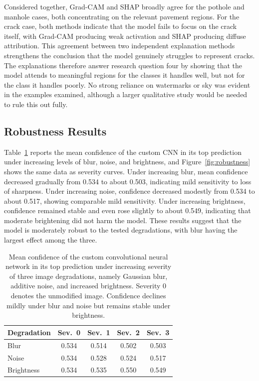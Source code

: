 \documentclass[preprint,12pt]{elsarticle}
\begin{document}
Considered together, Grad-CAM and SHAP broadly agree for the pothole and manhole cases, both concentrating on the relevant pavement regions.
For the crack case, both methods indicate that the model fails to focus on the crack itself, with Grad-CAM producing weak activation and SHAP producing diffuse attribution.
This agreement between two independent explanation methods strengthens the conclusion that the model genuinely struggles to represent cracks.
The explanations therefore answer research question four by showing that the model attends to meaningful regions for the classes it handles well, but not for the class it handles poorly.
No strong reliance on watermarks or sky was evident in the examples examined, although a larger qualitative study would be needed to rule this out fully.

\subsection{Robustness Results}

Table~\ref{tab:robustness} reports the mean confidence of the custom CNN in its top prediction under increasing levels of blur, noise, and brightness, and Figure~\ref{fig:robustness} shows the same data as severity curves.
Under increasing blur, mean confidence decreased gradually from 0.534 to about 0.503, indicating mild sensitivity to loss of sharpness.
Under increasing noise, confidence decreased modestly from 0.534 to about 0.517, showing comparable mild sensitivity.
Under increasing brightness, confidence remained stable and even rose slightly to about 0.549, indicating that moderate brightening did not harm the model.
These results suggest that the model is moderately robust to the tested degradations, with blur having the largest effect among the three.

\begin{table}[!ht]
\centering
\caption{Mean confidence of the custom convolutional neural network in its top prediction under increasing severity of three image degradations, namely Gaussian blur, additive noise, and increased brightness. Severity 0 denotes the unmodified image. Confidence declines mildly under blur and noise but remains stable under brightness.}
\label{tab:robustness}
\begin{tabular}{lcccc}
\toprule
\textbf{Degradation} & \textbf{Sev.\ 0} & \textbf{Sev.\ 1} & \textbf{Sev.\ 2} & \textbf{Sev.\ 3} \\
\midrule
Blur       & 0.534 & 0.514 & 0.502 & 0.503 \\
Noise      & 0.534 & 0.528 & 0.524 & 0.517 \\
Brightness & 0.534 & 0.535 & 0.550 & 0.549 \\
\bottomrule
\end{tabular}
\end{table}
\end{document}
